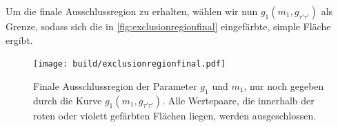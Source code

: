 \newpage
Um die finale Ausschlussregion zu erhalten, wählen wir nun $g_1(m_1,g_{\tau'\tau'})$ als Grenze, sodass sich die in \autoref{fig:exclusionregionfinal} eingefärbte, simple Fläche ergibt.

\begin{figure}[H]
    \centering
    \texttt{[image: build/exclusionregionfinal.pdf]}
    \caption{Finale Ausschlussregion der Parameter $g_1$ und $m_1$, nur noch gegeben durch die Kurve $g_1(m_1, g_{\tau'\tau'})$. Alle Wertepaare, die innerhalb der roten oder violett gefärbten Flächen liegen, werden ausgeschlossen.}
    \label{fig:exclusionregionfinal}
\end{figure}


